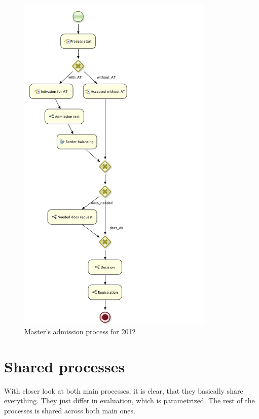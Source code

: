 	\begin{figure}[h]
		\label{fig:bpm:2012_msp_main}
		\centering
		\includegraphics[width=9.4cm]{figures/bpm/2012_msp_main}
		\caption{Master's admission process for 2012}
	\end{figure}
	
	\section{Shared processes}
	
	With closer look at both main processes, it is clear, that they basically share everything. They just differ in
	evaluation, which is parametrized. The rest of the processes is shared across both main ones.

